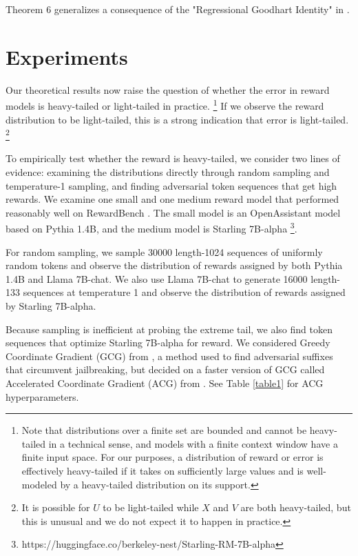 \documentclass{article}
\begin{document}
Theorem 6 generalizes a consequence of the "Regressional Goodhart Identity" in \citep{gao2023scaling}.

\section{Experiments}

Our theoretical results now raise the question of whether the error in reward models is heavy-tailed or light-tailed in practice. \footnote{Note that distributions over a finite set are bounded and cannot be heavy-tailed in a technical sense, and models with a finite context window have a finite input space. For our purposes, a distribution of reward or error is effectively heavy-tailed if it takes on sufficiently large values and is well-modeled by a heavy-tailed distribution on its support.} If we observe the reward distribution to be light-tailed, this is a strong indication that error is light-tailed. \footnote{It is possible for $U$ to be light-tailed while $X$ and $V$ are both heavy-tailed, but this is unusual and we do not expect it to happen in practice.}

To empirically test whether the reward is heavy-tailed, we consider two lines of evidence: examining the distributions directly through random sampling and temperature-1 sampling, and finding adversarial token sequences that get high rewards. We examine one small and one medium reward model that performed reasonably well on RewardBench \citep{lambert2023rewardbench}. The small model is an OpenAssistant model based on Pythia 1.4B, and the medium model is Starling 7B-alpha \citep{starling2023}\footnote{https://huggingface.co/berkeley-nest/Starling-RM-7B-alpha}.

For random sampling, we sample 30000 length-1024 sequences of uniformly random tokens and observe the distribution of rewards assigned by both Pythia 1.4B and Llama 7B-chat. We also use Llama 7B-chat to generate 16000 length-133 sequences at temperature 1 and observe the distribution of rewards assigned by Starling 7B-alpha.

Because sampling is inefficient at probing the extreme tail, we also find token sequences that optimize Starling 7B-alpha for reward. We considered Greedy Coordinate Gradient (GCG) from \citep{zou2023universal}, a method used to find adversarial suffixes that circumvent jailbreaking, but decided on a faster version of GCG called Accelerated Coordinate Gradient (ACG) from \citep{haizelabs2024acg}. See Table \ref{table1} for ACG hyperparameters.
\end{document}
